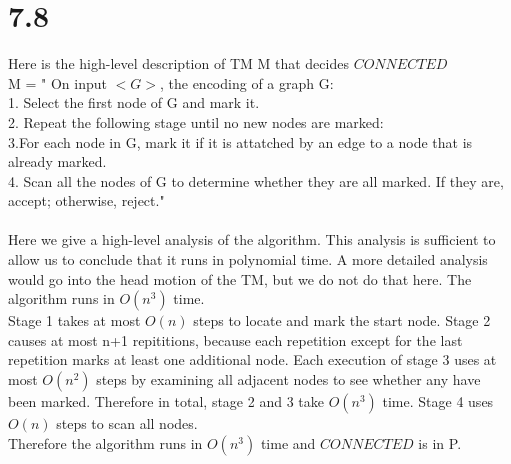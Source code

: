 \documentclass{scrartcl}
\begin{document}
\section*{7.8}
Here is the high-level description of TM M that decides $CONNECTED$ \\
M = " On input $<G>$, the encoding of a graph G:\\
1. Select the first node of G and mark it.\\
2. Repeat the following stage until no new nodes are marked:\\
3.\qquad For each node in G, mark it if it is attatched by an edge to a node that is already marked.\\
4. Scan all the nodes of G to determine whether they are all marked. If they are, accept; otherwise, reject."
\\
\\
Here we give a high-level analysis of the algorithm. This analysis is sufficient to allow us to conclude that it runs in polynomial time. A more detailed analysis would go into the head motion of the TM, but we do not do that here. The algorithm runs in $O(n^3)$ time.\\
Stage 1 takes at most $O(n)$ steps to locate and mark the start node. Stage 2 causes at most n+1 repititions, because each repetition except for the last repetition marks at least one additional node. Each execution of stage 3 uses at most $O(n^2)$ steps by examining all adjacent nodes to see whether any have been marked. Therefore in total, stage 2 and 3 take $O(n^3)$ time. Stage 4 uses $O(n)$ steps to scan all nodes.\\
Therefore the algorithm runs in $O(n^3)$ time and $CONNECTED$ is in P.
\end{document}
